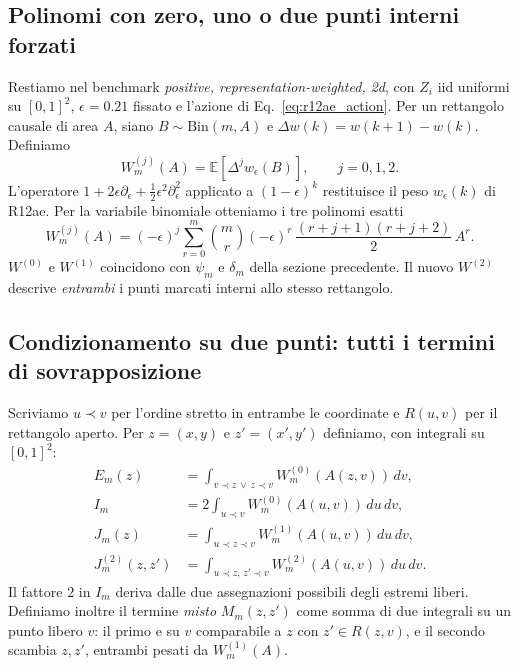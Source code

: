 \documentclass[11pt,a4paper]{article}
\begin{document}
\subsection{Polinomi con zero, uno o due punti interni forzati}

Restiamo nel benchmark \emph{positive, representation-weighted, 2d}, con $Z_i$ iid uniformi su $[0,1]^2$, $\epsilon=0.21$ fissato e l'azione di Eq.~\eqref{eq:r12ae_action}. Per un rettangolo causale di area $A$, siano $B\sim\mathrm{Bin}(m,A)$ e $\Delta w(k)=w(k+1)-w(k)$. Definiamo
\begin{equation}
 W_m^{(j)}(A)=\mathbb E[\Delta^j w_\epsilon(B)],\qquad j=0,1,2.
 \label{eq:r12af_Wdef}
\end{equation}
L'operatore $1+2\epsilon\partial_\epsilon+\frac12\epsilon^2\partial_\epsilon^2$ applicato a $(1-\epsilon)^k$ restituisce il peso $w_\epsilon(k)$ di R12ae. Per la variabile binomiale otteniamo i tre polinomi esatti
\begin{equation}
 \boxed{W_m^{(j)}(A)=(-\epsilon)^j\sum_{r=0}^m\binom mr(-\epsilon)^r\,
 \frac{(r+j+1)(r+j+2)}{2}\,A^r.}
 \label{eq:r12af_Wpoly}
\end{equation}
$W^{(0)}$ e $W^{(1)}$ coincidono con $\psi_m$ e $\delta_m$ della sezione precedente. Il nuovo $W^{(2)}$ descrive \emph{entrambi} i punti marcati interni allo stesso rettangolo.

\subsection{Condizionamento su due punti: tutti i termini di sovrapposizione}

Scriviamo $u\prec v$ per l'ordine stretto in entrambe le coordinate e $R(u,v)$ per il rettangolo aperto. Per $z=(x,y)$ e $z'=(x',y')$ definiamo, con integrali su $[0,1]^2$:
\begin{align}
 E_m(z)&=\int_{v\prec z\,\lor\,z\prec v} W_m^{(0)}(A(z,v))\,dv,\\
 I_m&=2\int_{u\prec v}W_m^{(0)}(A(u,v))\,du\,dv,\\
 J_m(z)&=\int_{u\prec z\prec v}W_m^{(1)}(A(u,v))\,du\,dv,\\
 J_m^{(2)}(z,z')&=\int_{u\prec z,\,z'\prec v}W_m^{(2)}(A(u,v))\,du\,dv.
 \label{eq:r12af_integrals}
\end{align}
Il fattore $2$ in $I_m$ deriva dalle due assegnazioni possibili degli estremi liberi. Definiamo inoltre il termine \emph{misto} $M_m(z,z')$ come somma di due integrali su un punto libero $v$: il primo e su $v$ comparabile a $z$ con $z'\in R(z,v)$, e il secondo scambia $z,z'$, entrambi pesati da $W_m^{(1)}(A)$.
\end{document}
